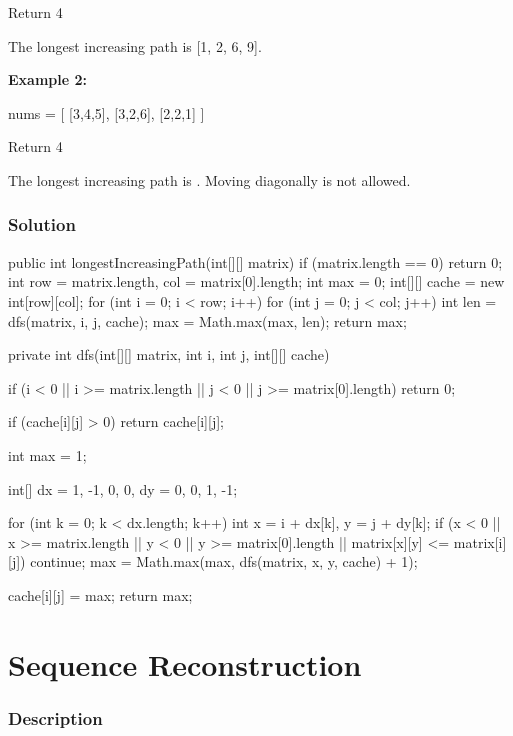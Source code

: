 Return 4

The longest increasing path is [1, 2, 6, 9].

\textbf{Example 2:}

\begin{Code}
nums = [
  [3,4,5],
  [3,2,6],
  [2,2,1]
]
\end{Code}

Return 4

The longest increasing path is \code{[3, 4, 5, 6]}. Moving diagonally is not allowed.

\newpage

\subsubsection{Solution}

\begin{Code}
public int longestIncreasingPath(int[][] matrix) {
    if (matrix.length == 0) {
        return 0;
    }
    int row = matrix.length, col = matrix[0].length;
    int max = 0;
    int[][] cache = new int[row][col];
    for (int i = 0; i < row; i++) {
        for (int j = 0; j < col; j++) {
            int len = dfs(matrix, i, j, cache);
            max = Math.max(max, len);
        }
    }
    return max;
}

private int dfs(int[][] matrix, int i, int j, int[][] cache) {
    if (i < 0 || i >= matrix.length || j < 0 || j >= matrix[0].length) {
        return 0;
    }

    if (cache[i][j] > 0) {
        return cache[i][j];
    }

    int max = 1;

    int[] dx = {1, -1, 0, 0}, dy = {0, 0, 1, -1};

    for (int k = 0; k < dx.length; k++) {
        int x = i + dx[k], y = j + dy[k];
        if (x < 0 || x >= matrix.length || y < 0 || y >= matrix[0].length
            || matrix[x][y] <= matrix[i][j]) {
            continue;
        }
        max = Math.max(max, dfs(matrix, x, y, cache) + 1);
    }

    cache[i][j] = max;
    return max;
}
\end{Code}

\newpage

\section{Sequence Reconstruction} %

\subsubsection{Description}

